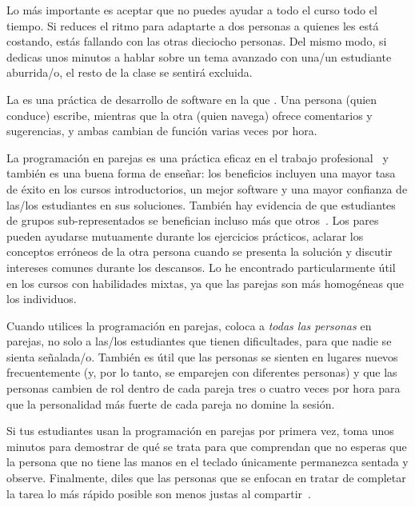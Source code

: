 Lo más importante es aceptar que
no puedes ayudar a todo el curso todo el tiempo.
Si reduces el ritmo para adaptarte a dos personas a quienes les está costando,
estás fallando con las otras dieciocho personas.
Del mismo modo,
si dedicas unos minutos a hablar sobre un tema avanzado con una/un estudiante aburrida/o,
el resto de la clase se sentirá excluida.


La  es una práctica de desarrollo de software
en la que .
Una persona (quien conduce) escribe,
mientras que la otra (quien navega) ofrece comentarios y sugerencias,
y ambas cambian de función varias veces por hora.

La programación en parejas es una práctica eficaz en el trabajo profesional~\cite{Hann2009}
y también es una buena forma de enseñar:
los beneficios incluyen una mayor tasa de éxito en los cursos introductorios,
un mejor software
y una mayor confianza de las/los estudiantes en sus soluciones.
También hay evidencia de que estudiantes de grupos sub-representados
se benefician incluso más que otros~\cite{McDo2006,Hank2011,Port2013,Cele2018}.
Los pares pueden ayudarse mutuamente durante los ejercicios prácticos,
aclarar los conceptos erróneos de la otra persona cuando se presenta la solución
y discutir intereses comunes durante los descansos.
Lo he encontrado particularmente útil en los cursos con habilidades mixtas,
ya que las parejas son más homogéneas que los individuos.

Cuando utilices la programación en parejas,
coloca a \emph{todas las personas} en parejas,
no solo a las/los estudiantes que tienen dificultades,
para que nadie se sienta señalada/o.
También es útil que las personas se sienten en lugares nuevos frecuentemente
(y, por lo tanto, se emparejen con diferentes personas)
y que las personas cambien de rol dentro de cada pareja tres o cuatro veces por hora
para que la personalidad más fuerte de cada pareja no domine la sesión.

Si tus estudiantes usan la programación en parejas por primera vez,
toma unos minutos para demostrar de qué se trata
para que comprendan que
no esperas que la persona que no tiene las manos en el teclado
únicamente permanezca sentada y observe.
Finalmente,
diles que las personas que se enfocan en tratar de completar la tarea lo más rápido posible
son menos justas al compartir~\cite{Lewi2015}.

